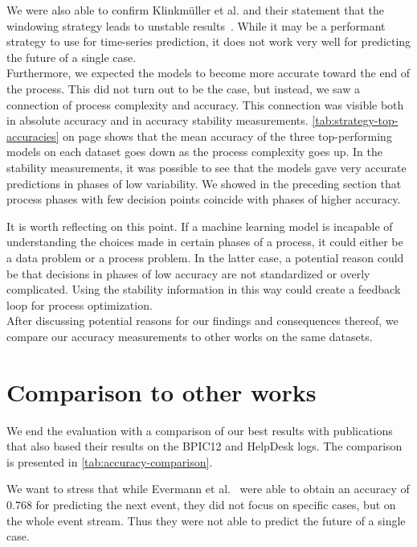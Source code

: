 We were also able to confirm Klinkmüller et al. and their statement that the windowing strategy leads to unstable results~\cite{klinkmuller2018reliablemonitoring}.
While it may be a performant strategy to use for time-series prediction, it does not work very well for predicting the future of a single case.\\

Furthermore, we expected the models to become more accurate toward the end of the process.
This did not turn out to be the case, but instead, we saw a connection of process complexity and accuracy.
This connection was visible both in absolute accuracy and in accuracy stability measurements.
\autoref{tab:strategy-top-accuracies} on page \pageref{tab:strategy-top-accuracies} shows that the mean accuracy of the three top-performing models on each dataset goes down as the process complexity goes up.
In the stability measurements, it was possible to see that the models gave very accurate predictions in phases of low variability.
We showed in the preceding section that process phases with few decision points coincide with phases of higher accuracy.

It is worth reflecting on this point.
If a machine learning model is incapable of understanding the choices made in certain phases of a process, it could either be a data problem or a process problem.
In the latter case, a potential reason could be that decisions in phases of low accuracy are not standardized or overly complicated.
Using the stability information in this way could create a feedback loop for process optimization.\\

After discussing potential reasons for our findings and consequences thereof, we compare our accuracy measurements to other works on the same datasets.

\section{Comparison to other works}
We end the evaluation with a comparison of our best results with publications that also based their results on the BPIC12 and HelpDesk logs.
The comparison is presented in \autoref{tab:accuracy-comparison}.

We want to stress that while Evermann et al.~\cite{evermann2016} were able to obtain an accuracy of $0.768$ for predicting the next event, they did not focus on specific cases, but on the whole event stream.
Thus they were not able to predict the future of a single case.

